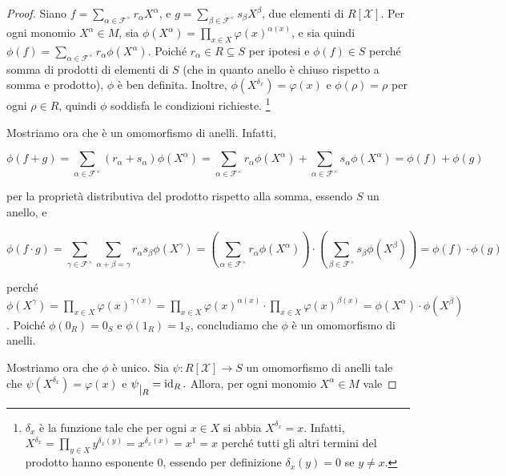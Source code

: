 \begin{proof}
	Siano $f=\sum\limits_{\alpha \in \mathcal{F}^\times} r_\alpha X^\alpha$, e $g=\sum\limits_{\beta \in \mathcal{F}^\times} s_\beta X^\beta$, due elementi di $R[\mathcal{X}]$. 
	Per ogni monomio $X^\alpha \in M$, sia $\phi(X^\alpha) = \prod\limits_{x \in X} \varphi(x)^{\alpha(x)}$, e sia quindi $\phi(f) = \sum\limits_{\alpha \in \mathcal{F}^\times} r_\alpha \phi(X^\alpha).$ 
	Poiché $r_\alpha \in R \subseteq S$ per ipotesi e $\phi(f) \in S$ perché somma di prodotti di elementi di $S$ (che in quanto anello è chiuso rispetto a somma e prodotto), $\phi$ è ben definita. 
	Inoltre, $\phi(X^{\delta_x}) = \varphi(x)$ e $\phi(\rho) = \rho$ per ogni $\rho \in R$, quindi $\phi$ soddisfa le condizioni richieste.
	\footnote{$\delta_x$ è la funzione tale che per ogni $x \in X$ si abbia $X^{\delta_x} = x$. 
	Infatti, $X^{\delta_x} = \prod\limits_{y \in X}y^{\delta_x(y)} = x^{\delta_x(x)} = x^1 = x$ perché tutti gli altri termini del prodotto hanno esponente $0$, essendo per definizione $\delta_x(y) = 0$ se $y \neq x$.}

	Mostriamo ora che è un omomorfismo di anelli. 
	Infatti, 
	
	\[\phi\left(f+g\right) = \sum\limits_{\alpha \in \mathcal{F}^\times}(r_\alpha + s_\alpha) \phi(X^\alpha) = \sum\limits_{\alpha \in \mathcal{F}^\times} r_\alpha \phi(X^\alpha) + \sum\limits_{\alpha \in \mathcal{F}^\times} s_\alpha \phi(X^\alpha) = \phi(f) + \phi(g)\]
	
	per la proprietà distributiva del prodotto rispetto alla somma, essendo $S$ un anello, e
	 
	\[\phi(f\cdot g) = 
	\sum\limits_{\gamma \in \mathcal{F}^\times} \sum\limits_{\alpha + \beta = \gamma} r_\alpha s_\beta \phi(X^\gamma) = 
	\left(\sum\limits_{\alpha \in \mathcal{F}^\times} r_\alpha \phi(X^\alpha) \right) \cdot \left(\sum\limits_{\beta \in \mathcal{F}^\times} s_\beta \phi(X^\beta) \right) = 
	\phi(f)\cdot \phi(g)\] 
	
	perché $\phi(X^\gamma) = 
	\prod\limits_{x \in X} \varphi(x)^{\gamma(x)} = 
	\prod\limits_{x\in X} \varphi(x)^{\alpha(x)} \cdot \prod\limits_{x \in X} \varphi(x)^{\beta(x)} = 
	\phi(X^\alpha) \cdot \phi(X^\beta)$. 
	Poiché $\phi(0_R)=0_S$ e $ \phi(1_R)=1_S$, concludiamo che $\phi$ è un omomorfismo di anelli.
	
	\vspace{1mm}
	
	Mostriamo ora che $\phi$ è unico. 
	Sia $\psi\colon R[\mathcal{X}]\to S$ un omomorfismo di anelli tale che $\psi(X^{\delta_x})=\varphi(x)$ e $\psi \raisebox{-.5em}{$\vert_{R}$}= \operatorname{id}_R.$ 
	Allora, per ogni monomio $X^\alpha \in M$ vale 
	

\end{proof}
